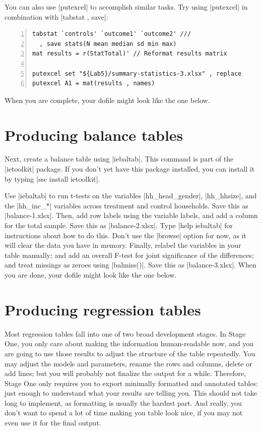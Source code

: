 \documentclass{tufte-handout}
\begin{document}
You can also use |putexcel| to accomplish similar tasks.
Try using |putexcel| in combination with |tabstat , save|:
\begin{Verbatim}[frame=leftline,numbers=left]
tabstat `controls' `outcome1' `outcome2' ///
  , save stats(N mean median sd min max)
mat results = r(StatTotal)' // Reformat results matrix

putexcel set "${Lab5}/summary-statistics-3.xlsx" , replace
putexcel A1 = mat(results , names)
\end{Verbatim}
When you are complete, your dofile might look like the one below.

\section{Producing balance tables}
Next, create a balance table using |iebaltab|.
This command is part of the |ietoolkit| package.
If you don’t yet have this package installed,
you can install it by typing |ssc install ietoolkit|.

Use |iebaltab| to run t-tests on the variables |hh_head_gender|,
|hh_hhsize|, and the |hh_inc_*| variables across treatment and control households.
Save this as |balance-1.xlsx|.
Then, add row labels using the variable labels,
and add a column for the total sample.
Save this as |balance-2.xlsx|.
Type |help iebaltab| for instructions about how to do this.
Don't use the |browse| option for now,
as it will clear the data you have in memory.
Finally, relabel the variables in your table manually;
and add an overall F-test for joint significance
of the differences; and treat missings as zeroes using |balmiss()|.
Save this as |balance-3.xlsx|.
When you are done, your dofile might look like the one below.

\section{Producing regression tables}
Most regression tables fall into one of two broad development stages.
In Stage One, you only care about making the information human-readable now,
and you are going to use those results to adjust the structure of the table repeatedly.
You may adjust the models and parameters, rename the rows and columns, delete or add lines;
but you will probably not finalize the output for a while.
Therefore, Stage One only requires you to export minimally formatted and annotated tables:
just enough to understand what your results are telling you.
This should not take long to implement, as formatting is usually the hardest part.
And really, you don't want to spend a lot of time making you table look nice,
if you may not even use it for the final output.
\end{document}
